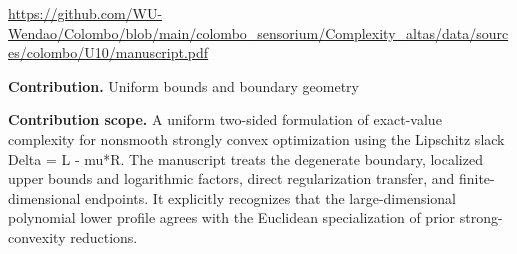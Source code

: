 \documentclass[10pt,a4paper]{article}
\begin{document}
\url{https://github.com/WU-Wendao/Colombo/blob/main/colombo_sensorium/Complexity_altas/data/sources/colombo/U10/manuscript.pdf}



\textbf{Contribution.} Uniform bounds and boundary geometry



\textbf{Contribution scope.} A uniform two-sided formulation of exact-value complexity for nonsmooth strongly convex optimization using the Lipschitz slack Delta = L - mu*R. The manuscript treats the degenerate boundary, localized upper bounds and logarithmic factors, direct regularization transfer, and finite-dimensional endpoints. It explicitly recognizes that the large-dimensional polynomial lower profile agrees with the Euclidean specialization of prior strong-convexity reductions.
\end{document}
